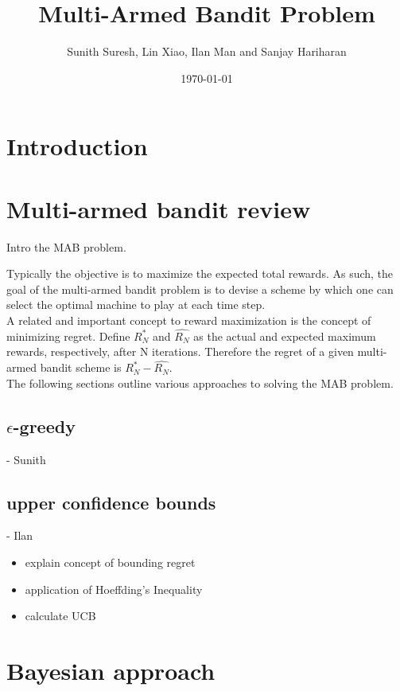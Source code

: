 \documentclass{article}
\title{Multi-Armed Bandit Problem}
\author{Sunith Suresh, Lin Xiao, Ilan Man and Sanjay Hariharan}
\date{\today}
\begin{document}
\maketitle

\section{Introduction}

\section{Multi-armed bandit review}

Intro the MAB problem.

Typically the objective is to maximize the expected total rewards. As such, the goal of the multi-armed bandit problem is to devise a scheme by which one can select the optimal machine to play at each time step.\\

A related and important concept to reward maximization is the concept of minimizing regret. Define $R_{N}^{*}$ and $\hat{R_{N}}$ as the actual and expected maximum rewards, respectively, after N iterations. Therefore the regret of a given multi-armed bandit scheme is $R_{N}^{*} - \hat{R_{N}}$.\\

The following sections outline various approaches to solving the MAB problem.

\subsection{$\epsilon$-greedy}

- Sunith

\subsection{upper confidence bounds}

- Ilan

\begin{itemize}
\item  explain concept of bounding regret
\item  application of Hoeffding's Inequality
\item  calculate UCB
\end{itemize}

\section{Bayesian approach}
\end{document}
